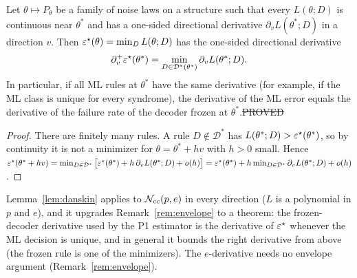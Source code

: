 \begin{lemma}\label{lem:danskin}
Let $\theta\mapsto P_\theta$ be a family of noise laws on a structure such that every $L(\theta;D)$ is continuous near $\theta^\ast$ and has a one-sided directional derivative $\partial_vL(\theta^\ast;D)$ in a direction $v$. Then $\varepsilon^{\star}(\theta)=\min_DL(\theta;D)$ has the one-sided directional derivative
\[
\partial_v^+\varepsilon^{\star}(\theta^\ast)=\min_{D\in\mathcal D^\ast(\theta^\ast)}\partial_vL(\theta^\ast;D).
\]
In particular, if all ML rules at $\theta^\ast$ have the same derivative (for example, if the ML class is unique for every syndrome), the derivative of the ML error equals the derivative of the failure rate of the decoder frozen at $\theta^\ast$.\hfill\st{PROVED}
\end{lemma}
\begin{proof}
There are finitely many rules. A rule $D\notin\mathcal D^\ast$ has $L(\theta^\ast;D)>\varepsilon^{\star}(\theta^\ast)$, so by continuity it is not a minimizer for $\theta=\theta^\ast+hv$ with $h>0$ small. Hence $\varepsilon^{\star}(\theta^\ast+hv)=\min_{D\in\mathcal D^\ast}\big[\varepsilon^{\star}(\theta^\ast)+h\,\partial_vL(\theta^\ast;D)+o(h)\big]=\varepsilon^{\star}(\theta^\ast)+h\min_{D\in\mathcal D^\ast}\partial_vL(\theta^\ast;D)+o(h)$.
\end{proof}

\noindent Lemma~\ref{lem:danskin} applies to $\mathcal{N}_{\rm cc}(p,e)$ in every direction ($L$ is a polynomial in $p$ and $e$), and it upgrades Remark~\ref{rem:envelope} to a theorem: the frozen-decoder derivative used by the P1 estimator is the derivative of $\varepsilon^{\star}$ whenever the ML decision is unique, and in general it bounds the right derivative from above (the frozen rule is one of the minimizers). The $e$-derivative needs no envelope argument (Remark~\ref{rem:envelope}).

